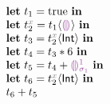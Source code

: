

\newcommand{\THole}{\ensuremath{\SyEHole{}{}}}
\newcommand{\TInt}{\ensuremath{\SyTInt}}

\newcommand{\ELet}[2]{\ensuremath{\SyLet #1 = #2}}
\newcommand{\ELetAnn}[3]{\ensuremath{\SyLet #1 \SyColon #2 = #3}}
\newcommand{\EInn}{\ensuremath{\SyInn}}
\newcommand{\EIn}[1]{\ensuremath{\SyIn #1}}
\newcommand{\EPlus}[2]{\ensuremath{#1 \SyPlus #2}}
\newcommand{\ETimes}[2]{\ensuremath{#1 \SyTimes #2}}
\newcommand{\ECast}[2]{\ensuremath{#1 \SyCastL #2 \SyCastR}}

\newcommand{\ETrue}{\ensuremath{\SyTrue}}
\newcommand{\EEHole}[1]{\ensuremath{\SyEHole{#1}{\sigma_{#1}}}}

\newcommand{\ENamed}[2]{\ensuremath{t_{#1}^{{\color{gray}#2}}}}


  \[\begin{array}{l}
    \ELet{t_1}{\ETrue} \EInn \\
    \ELet{\ENamed{2}{x}}{\ECast{t_1}{\THole}} \EInn \\
    \ELet{t_3}{\ECast{\ENamed{2}{x}}{\TInt}} \EInn \\
    \ELet{t_4}{\ETimes{t_3}{6}} \EInn \\
    \ELet{t_5}{\EPlus{t_4}{\EEHole{1}}} \EInn \\
    \ELet{t_6}{\ECast{\ENamed{2}{x}}{\TInt}} \EInn \\
    {\EPlus{t_6}{t_5}}
  \end{array}\]

